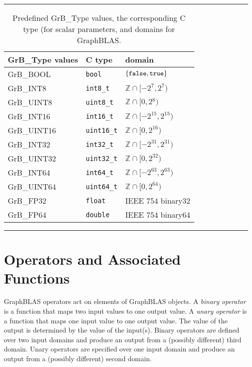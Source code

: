 \begin{table}
\hrule
\begin{center}
\caption{Predefined {\sf GrB\_Type} values, the corresponding C type (for scalar
parameters, and domains for GraphBLAS.}
\label{Tab:PredefinedTypes}
\begin{tabular}{l|l|l}
{\sf GrB\_Type values} & C type            & domain \\
\hline
{\sf GrB\_BOOL}        & {\tt bool}        & $\{ {\tt false}, {\tt true} \}$  \\
{\sf GrB\_INT8}        & {\tt int8\_t}     & $\mathbb{Z} \cap [-2^{7},2^{7})$  \\
{\sf GrB\_UINT8}       & {\tt uint8\_t}    & $\mathbb{Z} \cap [0,2{^8})$  \\
{\sf GrB\_INT16}       & {\tt int16\_t}    & $\mathbb{Z} \cap [-2^{15},2^{15})$ \\
{\sf GrB\_UINT16}      & {\tt uint16\_t}   & $\mathbb{Z} \cap [0,2^{16})$ \\
{\sf GrB\_INT32}       & {\tt int32\_t}    & $\mathbb{Z} \cap [-2^{31},2^{31})$ \\
{\sf GrB\_UINT32}      & {\tt uint32\_t}   & $\mathbb{Z} \cap [0,2^{32})$ \\
{\sf GrB\_INT64}       & {\tt int64\_t}    & $\mathbb{Z} \cap [-2^{63},2^{63})$ \\
{\sf GrB\_UINT64}      & {\tt uint64\_t}   & $\mathbb{Z} \cap [0,2^{64})$ \\
{\sf GrB\_FP32}        & {\tt float}       & IEEE 754 {\sf binary32}  \\
{\sf GrB\_FP64}        & {\tt double}      & IEEE 754 {\sf binary64}  \\
\end{tabular}
\end{center}
\hrule
\end{table}

\section{Operators and Associated Functions}

GraphBLAS operators act on elements of GraphBLAS objects.   A
 \emph{binary operator} is a function that maps two input
values to one output value. A \emph{unary operator} is a function that 
maps one input value to one output value. The value of the output is 
determined by the value of the input(s).  Binary operators are defined over 
two input domains and produce an output from a (possibly different) third 
domain. Unary operators are specified over one input domain and produce an 
output from a (possibly different) second domain.

